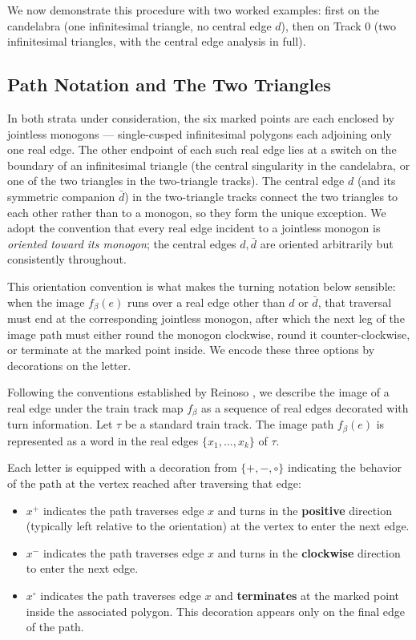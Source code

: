 We now demonstrate this procedure with two worked examples: first on the candelabra (one infinitesimal triangle, no central edge $d$), then on Track 0 (two infinitesimal triangles, with the central edge analysis in full).

\subsection{Path Notation and The Two Triangles}
\label{subsec:path_notation_two_triangles}

In both strata under consideration, the six marked points are each enclosed by jointless monogons --- single-cusped infinitesimal polygons each adjoining only one real edge. The other endpoint of each such real edge lies at a switch on the boundary of an infinitesimal triangle (the central singularity in the candelabra, or one of the two triangles in the two-triangle tracks). The central edge $d$ (and its symmetric companion $\bar{d}$) in the two-triangle tracks connect the two triangles to each other rather than to a monogon, so they form the unique exception. We adopt the convention that every real edge incident to a jointless monogon is \emph{oriented toward its monogon}; the central edges $d, \bar{d}$ are oriented arbitrarily but consistently throughout.

This orientation convention is what makes the turning notation below sensible: when the image $f_\beta(e)$ runs over a real edge other than $d$ or $\bar{d}$, that traversal must end at the corresponding jointless monogon, after which the next leg of the image path must either round the monogon clockwise, round it counter-clockwise, or terminate at the marked point inside. We encode these three options by decorations on the letter.

Following the conventions established by Reinoso \cite{reinoso2024pseudo}, we describe the image of a real edge under the train track map $f_\beta$ as a sequence of real edges decorated with turn information. Let $\tau$ be a standard train track. The image path $f_\beta(e)$ is represented as a word in the real edges $\{x_1, \dots, x_k\}$ of $\tau$.


Each letter is equipped with a decoration from $\{+, -, \circ\}$ indicating the behavior of the path at the vertex reached after traversing that edge:
\begin{itemize}
    \item $x^+$ indicates the path traverses edge $x$ and turns in the \textbf{positive} direction (typically left relative to the orientation) at the vertex to enter the next edge.
    \item $x^-$ indicates the path traverses edge $x$ and turns in the \textbf{clockwise} direction to enter the next edge.
    \item $x^\circ$ indicates the path traverses edge $x$ and \textbf{terminates} at the marked point inside the associated polygon. This decoration appears only on the final edge of the path.
\end{itemize}

